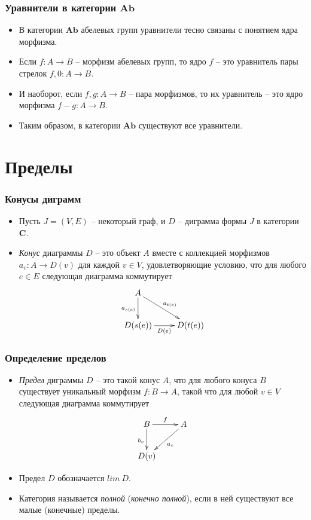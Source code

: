 \documentclass{beamer}
\theoremstyle{definition}
\newcommand{\cat}[1]{\mathbf{#1}}
\renewcommand{\C}{\cat{C}}
\newcommand{\Ab}{\cat{Ab}}
\begin{document}
\begin{frame}
\frametitle{Уравнители в категории $\Ab$}
\begin{itemize}
\item В категории $\Ab$ абелевых групп уравнители тесно связаны с понятием ядра морфизма.
\item Если $f : A \to B$ -- морфизм абелевых групп, то ядро $f$ -- это уравнитель пары стрелок $f, 0 : A \to B$.
\item И наоборот, если $f, g : A \to B$ -- пара морфизмов, то их уравнитель -- это ядро морфизма $f - g : A \to B$.
\item Таким образом, в категории $\Ab$ существуют все уравнители.
\end{itemize}
\end{frame}

\section{Пределы}

\begin{frame}
\frametitle{Конусы диграмм}
\begin{itemize}
\item Пусть $J = (V,E)$ -- некоторый граф, и $D$ -- диграмма формы $J$ в категории $\C$.
\item \emph{Конус} диаграммы $D$ -- это объект $A$ вместе с коллекцией морфизмов $a_v : A \to D(v)$ для каждой $v \in V$, удовлетворяющие условию, что для любого $e \in E$ следующая диаграмма коммутирует
\[ \xymatrix{ A \ar[d]_{a_{s(e)}} \ar[rd]^{a_{t(e)}} \\
              D(s(e)) \ar[r]_{D(e)} & D(t(e))
            } \]
\end{itemize}
\end{frame}

\begin{frame}
\frametitle{Определение пределов}
\begin{itemize}
\item \emph{Предел} диграммы $D$ -- это такой конус $A$, что для любого конуса $B$ существует уникальный морфизм $f : B \to A$, такой что для любой $v \in V$ следующая диаграмма коммутирует
\[ \xymatrix{ B \ar[d]_{b_v} \ar[r]^f & A \ar[dl]^{a_v} \\
              D(v)
            } \]
\item Предел $D$ обозначается $lim\ D$.
\item Категория называется \emph{полной} (\emph{конечно полной}), если в ней существуют все малые (конечные) пределы.
\end{itemize}
\end{frame}
\end{document}

